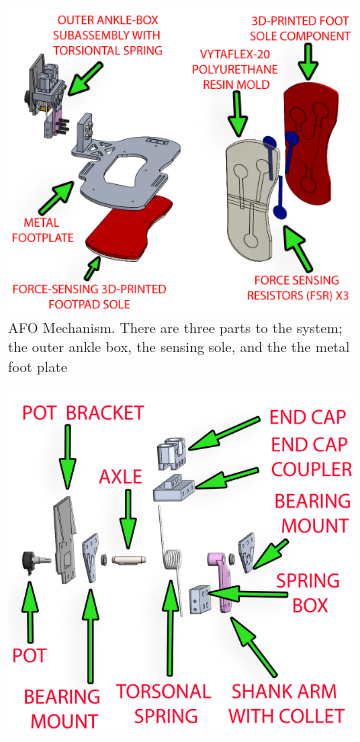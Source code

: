 \begin{figure}[h!]
    \centering
    \begin{subfigure}[b]{0.45\textwidth}
        \centering
        \captionsetup{justification=centering}
        \centerline{
        \includegraphics[scale=0.2]{images/mech_design/AFO_Exploded_AND_Force_Sole_WITH_Labels2.png}}
        \caption{AFO Mechanism. There are three parts to the system; the outer ankle box, the sensing sole, and the the metal foot plate}
        \label{fig:AFO Mechanism Full}
    \end{subfigure}
    \begin{subfigure}[b]{.45\textwidth}
        \centering
        \captionsetup{justification=centering}
        \centerline{
        \includegraphics[scale=0.15]{images/mech_design/Outer_Ankle_Box_Exploded_WITH_Labels2.png}}

\end{subfigure}
\end{figure}
